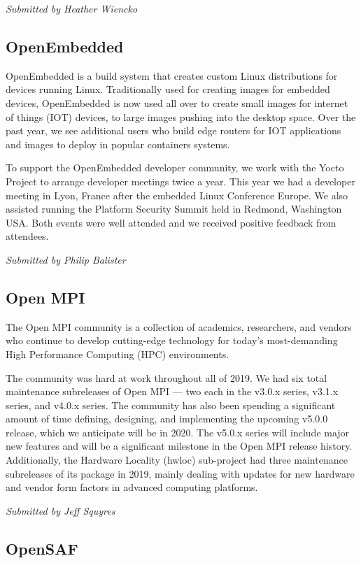 \documentclass[a4paper]{report}
\begin{document}
{\em Submitted by Heather Wiencko}

\subsection{OpenEmbedded}

OpenEmbedded is a build system that creates custom Linux distributions
for devices running Linux. Traditionally used for creating images for
embedded devices, OpenEmbedded is now used all over to create small
images for internet of things (IOT) devices, to large images pushing
into the desktop space.  Over the past year, we see additional users who
build edge routers for IOT applications and images to deploy in popular
containers systems.

To support the OpenEmbedded developer community, we work with the Yocto
Project to arrange developer meetings twice a year. This year we had a
developer meeting in Lyon, France after the embedded Linux Conference
Europe. We also assisted running the Platform Security Summit held in
Redmond, Washington USA. Both events were well attended and we received
positive feedback from attendees.

{\em Submitted by Philip Balister}

\subsection{Open MPI}

The Open MPI community is a collection of academics, researchers, and
vendors who continue to develop cutting-edge technology for today's
most-demanding High Performance Computing (HPC) environments.

The community was hard at work throughout all of 2019.  We had six total
maintenance subreleases of Open MPI --- two each in the v3.0.x series,
v3.1.x series, and v4.0.x series.  The community has also been spending
a significant amount of time defining, designing, and implementing the
upcoming v5.0.0 release, which we anticipate will be in 2020.  The
v5.0.x series will include major new features and will be a significant
milestone in the Open MPI release history.  Additionally, the Hardware
Locality (hwloc) sub-project had three maintenance subreleases of its
package in 2019, mainly dealing with updates for new hardware and vendor
form factors in advanced computing platforms.

{\em Submitted by Jeff Squyres}

\subsection{OpenSAF}
\end{document}
